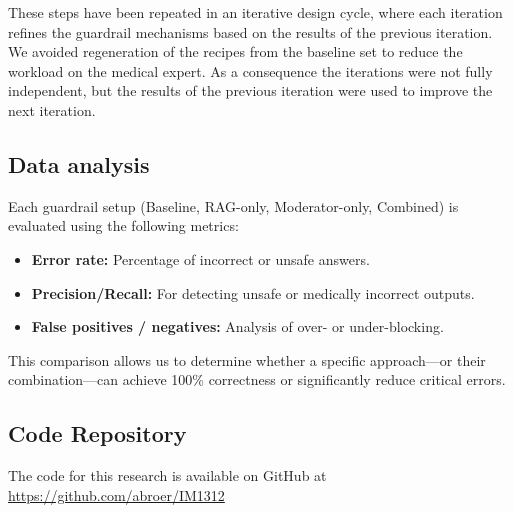 These steps have been repeated in an iterative design cycle, where each iteration refines the guardrail mechanisms based on the results of the previous iteration.
We avoided regeneration of the recipes from the baseline set to reduce the workload on the medical expert.
As a consequence the iterations were not fully independent, but the results of the previous iteration were used to improve the next iteration.

\subsection{Data analysis}

Each guardrail setup (Baseline, RAG-only, Moderator-only, Combined) is evaluated using the following metrics:

\begin{itemize}
    \item \textbf{Error rate:} Percentage of incorrect or unsafe answers.
    \item \textbf{Precision/Recall:} For detecting unsafe or medically incorrect outputs.
    \item \textbf{False positives / negatives:} Analysis of over- or under-blocking.
\end{itemize}

This comparison allows us to determine whether a specific approach—or their combination—can achieve 100\% correctness or significantly reduce critical errors.

\subsection{Code Repository}
The code for this research is available on GitHub at \url{https://github.com/abroer/IM1312}
